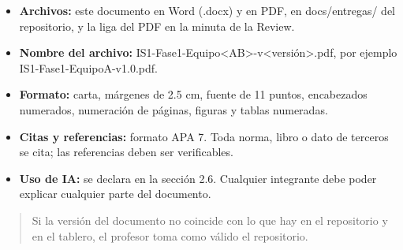 \begin{itemize}
\item
  \textbf{Archivos:} este documento en Word (.docx) y en PDF, en
  docs/entregas/ del repositorio, y la liga del PDF en la minuta de la
  Review.
\item
  \textbf{Nombre del archivo:}
  IS1-Fase1-Equipo\textless A\textbar B\textgreater-v\textless versión\textgreater.pdf,
  por ejemplo IS1-Fase1-EquipoA-v1.0.pdf.
\item
  \textbf{Formato:} carta, márgenes de 2.5 cm, fuente de 11 puntos,
  encabezados numerados, numeración de páginas, figuras y tablas
  numeradas.
\item
  \textbf{Citas y referencias:} formato APA 7. Toda norma, libro o dato
  de terceros se cita; las referencias deben ser verificables.
\item
  \textbf{Uso de IA:} se declara en la sección 2.6. Cualquier integrante
  debe poder explicar cualquier parte del documento.
\end{itemize}

\begin{quote}
Si la versión del documento no coincide con lo que hay en el repositorio
y en el tablero, el profesor toma como válido el repositorio.
\end{quote}
